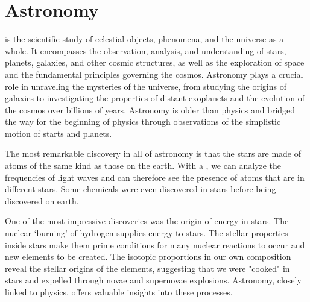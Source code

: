\section{Astronomy}

 is the scientific study of celestial objects, phenomena, and the universe as a whole. It encompasses the observation, analysis, and understanding of stars, planets, galaxies, and other cosmic structures, as well as the exploration of space and the fundamental principles governing the cosmos. Astronomy plays a crucial role in unraveling the mysteries of the universe, from studying the origins of galaxies to investigating the properties of distant exoplanets and the evolution of the cosmos over billions of years. Astronomy is older than physics and bridged the way for the beginning of physics through observations of the simplistic motion of starts and planets. 

The most remarkable discovery in all of astronomy is that the stars are made of atoms of the same kind as those on the earth. With a , we can analyze the frequencies of light waves and can therefore see the presence of atoms that are in different stars. Some chemicals were even discovered in stars before being discovered on earth.

One of the most impressive discoveries was the origin of energy in stars. The nuclear `burning' of hydrogen supplies energy to stars. The stellar properties inside stars make them prime conditions for many nuclear reactions to occur and new elements to be created. The isotopic proportions in our own composition reveal the stellar origins of the elements, suggesting that we were "cooked" in stars and expelled through novae and supernovae explosions. Astronomy, closely linked to physics, offers valuable insights into these processes.